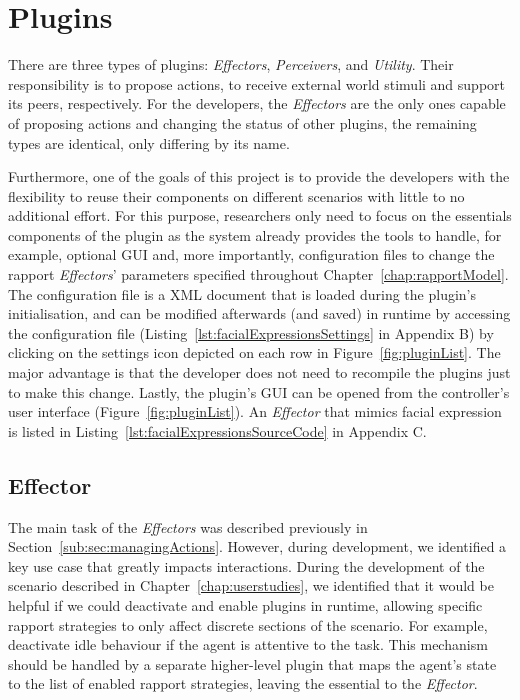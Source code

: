 \section{Plugins}
\label{sec:plugins}

There are three types of plugins: \textit{Effectors}, \textit{Perceivers}, and \textit{Utility}. Their responsibility is to propose actions, to receive external world stimuli and support its peers, respectively. For the developers, the \textit{Effectors} are the only ones capable of proposing actions and changing the status of other plugins, the remaining types are identical, only differing by its name.

Furthermore, one of the goals of this project is to provide the developers with the flexibility to reuse their components on different scenarios with little to no additional effort. For this purpose, researchers only need to focus on the essentials components of the plugin as the system already provides the tools to handle, for example, optional \ac{GUI} and, more importantly, configuration files to change the rapport \textit{Effectors}' parameters specified throughout Chapter~\ref{chap:rapportModel}. The configuration file is a \ac{XML} document that is loaded during the plugin's initialisation, and can be modified afterwards (and saved) in runtime by accessing the configuration file (Listing~\ref{lst:facialExpressionsSettings} in Appendix B) by clicking on the settings icon depicted on each row in Figure~\ref{fig:pluginList}. The major advantage is that the developer does not need to recompile the plugins just to make this change. Lastly, the plugin's \ac{GUI} can be opened from the controller's user interface (Figure~\ref{fig:pluginList}). An \textit{Effector} that mimics facial expression is listed in Listing~\ref{lst:facialExpressionsSourceCode} in Appendix C.

\subsection{Effector}
\label{sub:sec:effectorPlugin}


The main task of the \textit{Effectors} was described previously in Section~\ref{sub:sec:managingActions}. However, during development, we identified a key use case that greatly impacts interactions. During the development of the scenario described in Chapter~\ref{chap:userstudies}, we identified that it would be helpful if we could deactivate and enable plugins in runtime, allowing specific rapport strategies to only affect discrete sections of the scenario. For example, deactivate idle behaviour if the agent is attentive to the task. This mechanism should be handled by a separate higher-level plugin that maps the agent's state to the list of enabled rapport strategies, leaving the essential to the \textit{Effector}.

